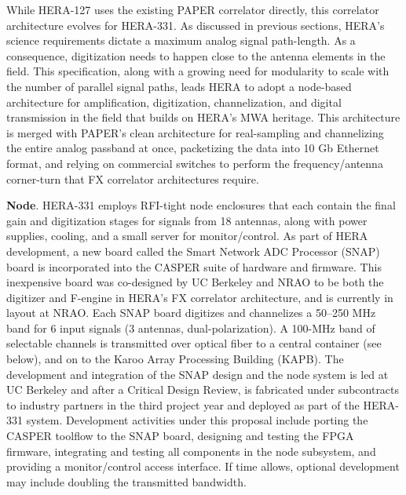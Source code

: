 \documentclass[ars]{copernicus}
\begin{document}
While HERA-127 uses the existing PAPER correlator directly, this correlator architecture evolves for
HERA-331.  As discussed in previous sections,
HERA's science requirements dictate a maximum analog signal path-length.  As a consequence,
digitization needs to happen close to the antenna
elements in the field.  This specification, along with a growing need for modularity to scale with the number of parallel signal paths,
leads HERA to adopt a node-based architecture for amplification, digitization, channelization, and digital
transmission in the field that builds on HERA's MWA heritage.  This architecture is merged with PAPER's clean 
architecture for real-sampling and channelizing the entire analog passband at once, packetizing the data into
10 Gb Ethernet format, and relying on commercial switches to perform the frequency/antenna corner-turn that
FX correlator architectures require. 



{\bf Node}. HERA-331 employs RFI-tight node enclosures that each contain the final gain and digitization stages for
signals from 18 antennas, along with power supplies, cooling, and a small server for monitor/control.  
As part of HERA development,
a new board called the Smart Network ADC Processor (SNAP) board is incorporated 
into the CASPER suite of hardware and firmware. This inexpensive board was co-designed by UC Berkeley and NRAO to be
both the digitizer and F-engine in HERA's FX correlator architecture,
and is currently in layout at NRAO.  Each SNAP board 
digitizes and channelizes a 50--250 MHz band for 6 input signals (3 antennas, dual-polarization).
A 100-MHz band of selectable channels is transmitted over optical fiber
to a central container (see below), and on to the Karoo Array Processing Building (KAPB).  The development and integration of the SNAP
design and the node system is led at UC Berkeley and after a Critical Design Review, is fabricated
under subcontracts to industry partners in the third project year and deployed as part of the HERA-331 system.
Development activities under this proposal include porting the CASPER toolflow to
the SNAP board, designing and testing the FPGA firmware,
integrating and testing all components in the node subsystem, and providing a monitor/control
access interface.  If time allows, optional development may include doubling the transmitted bandwidth.
\end{document}
